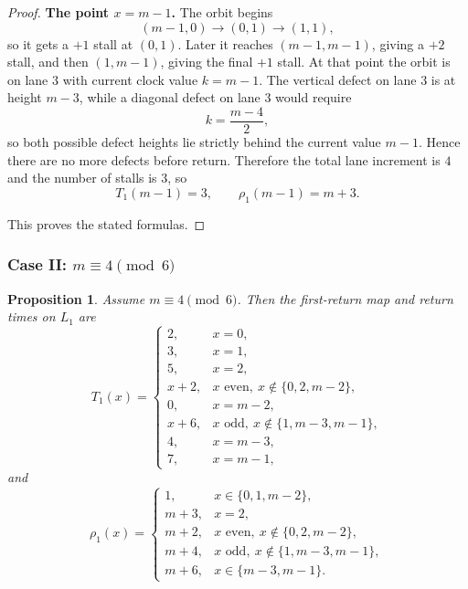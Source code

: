 \documentclass[11pt]{article}
\newtheorem{proposition}{Proposition}
\begin{document}
\begin{proof}
\smallskip
\noindent\textbf{The point $x=m-1$.}
The orbit begins
\[
(m-1,0)\to (0,1)\to (1,1),
\]
so it gets a $+1$ stall at $(0,1)$.
Later it reaches $(m-1,m-1)$, giving a $+2$ stall, and then $(1,m-1)$, giving the final $+1$ stall.
At that point the orbit is on lane $3$ with current clock value $k=m-1$.
The vertical defect on lane $3$ is at height $m-3$, while a diagonal defect on lane $3$ would require
\[
k=\frac{m-4}{2},
\]
so both possible defect heights lie strictly behind the current value $m-1$.
Hence there are no more defects before return.
Therefore the total lane increment is $4$ and the number of stalls is $3$, so
\[
T_1(m-1)=3,\qquad \rho_1(m-1)=m+3.
\]

This proves the stated formulas.
\end{proof}

\subsubsection{Case II: $m\equiv 4\pmod 6$}

\begin{proposition}\label{prop:R1-caseII}
Assume $m\equiv 4\pmod 6$.
Then the first-return map and return times on $L_1$ are
\[
T_1(x)=
\begin{cases}
2,&x=0,\\
3,&x=1,\\
5,&x=2,\\
x+2,&x\text{ even},\ x\notin\{0,2,m-2\},\\
0,&x=m-2,\\
x+6,&x\text{ odd},\ x\notin\{1,m-3,m-1\},\\
4,&x=m-3,\\
7,&x=m-1,
\end{cases}
\]
and
\[
\rho_1(x)=
\begin{cases}
1,&x\in\{0,1,m-2\},\\
m+3,&x=2,\\
m+2,&x\text{ even},\ x\notin\{0,2,m-2\},\\
m+4,&x\text{ odd},\ x\notin\{1,m-3,m-1\},\\
m+6,&x\in\{m-3,m-1\}.
\end{cases}
\]
\end{proposition}
\end{document}
